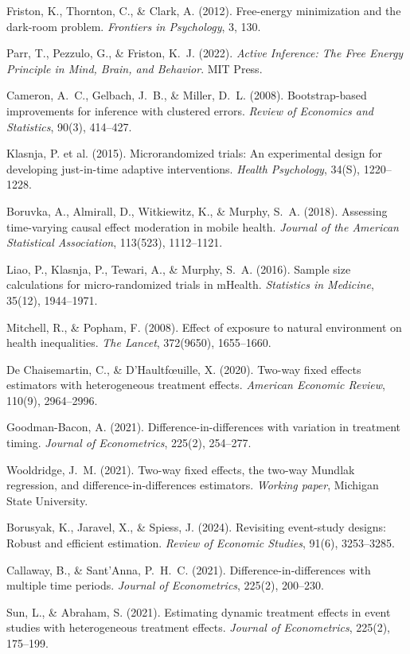 \documentclass[a4paper,11pt,titlepage]{article}
\begin{document}
\begin{small}
\begin{enumerate}[label={[\arabic*]}, leftmargin=2em, itemsep=2pt]
  \item Friston, K., Thornton, C., \& Clark, A. (2012). Free-energy minimization and the dark-room problem. \textit{Frontiers in Psychology}, 3, 130.
  \item Parr, T., Pezzulo, G., \& Friston, K.~J. (2022). \textit{Active Inference: The Free Energy Principle in Mind, Brain, and Behavior}. MIT Press.
  \item Cameron, A.~C., Gelbach, J.~B., \& Miller, D.~L. (2008). Bootstrap-based improvements for inference with clustered errors. \textit{Review of Economics and Statistics}, 90(3), 414--427.
  \item Klasnja, P. et al. (2015). Microrandomized trials: An experimental design for developing just-in-time adaptive interventions. \textit{Health Psychology}, 34(S), 1220--1228.
  \item Boruvka, A., Almirall, D., Witkiewitz, K., \& Murphy, S.~A. (2018). Assessing time-varying causal effect moderation in mobile health. \textit{Journal of the American Statistical Association}, 113(523), 1112--1121.
  \item Liao, P., Klasnja, P., Tewari, A., \& Murphy, S.~A. (2016). Sample size calculations for micro-randomized trials in mHealth. \textit{Statistics in Medicine}, 35(12), 1944--1971.
  \item Mitchell, R., \& Popham, F. (2008). Effect of exposure to natural environment on health inequalities. \textit{The Lancet}, 372(9650), 1655--1660.
  \item De Chaisemartin, C., \& D'Haultf{\oe}uille, X. (2020). Two-way fixed effects estimators with heterogeneous treatment effects. \textit{American Economic Review}, 110(9), 2964--2996.
  \item Goodman-Bacon, A. (2021). Difference-in-differences with variation in treatment timing. \textit{Journal of Econometrics}, 225(2), 254--277.
  \item Wooldridge, J.~M. (2021). Two-way fixed effects, the two-way Mundlak regression, and difference-in-differences estimators. \textit{Working paper}, Michigan State University.
  \item Borusyak, K., Jaravel, X., \& Spiess, J. (2024). Revisiting event-study designs: Robust and efficient estimation. \textit{Review of Economic Studies}, 91(6), 3253--3285.
  \item Callaway, B., \& Sant'Anna, P.~H.~C. (2021). Difference-in-differences with multiple time periods. \textit{Journal of Econometrics}, 225(2), 200--230.
  \item Sun, L., \& Abraham, S. (2021). Estimating dynamic treatment effects in event studies with heterogeneous treatment effects. \textit{Journal of Econometrics}, 225(2), 175--199.

\end{enumerate}
\end{small}
\end{document}
